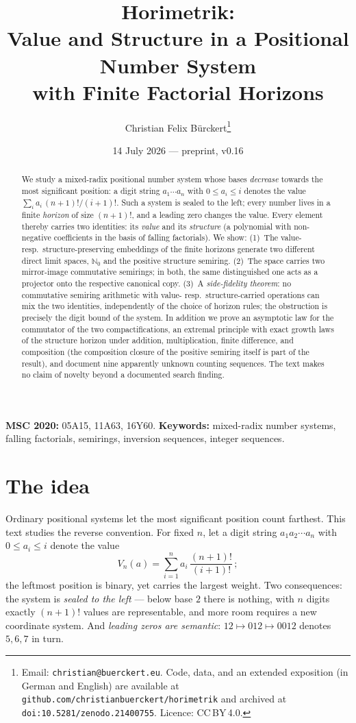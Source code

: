 \documentclass[11pt]{article}
\title{Horimetrik:\\
Value and Structure in a Positional Number System\\
with Finite Factorial Horizons}
\author{Christian Felix Bürckert\thanks{Email:
\texttt{christian@buerckert.eu}. Code, data, and an extended
exposition (in German and English) are available at
\texttt{github.com/christianbuerckert/horimetrik} and archived
at \texttt{doi:10.5281/zenodo.21400755}. Licence: CC\,BY\,4.0.}}
\date{14 July 2026 --- preprint, v0.16}
\theoremstyle{definition}
\theoremstyle{remark}
\newcommand{\NN}{\mathbb N_0}
\begin{document}
\maketitle

\begin{abstract}
We study a mixed-radix positional number system whose bases
\emph{decrease} towards the most significant position: a digit
string $a_1\cdots a_n$ with $0\le a_i\le i$ denotes the value
$\sum_i a_i\,(n+1)!/(i+1)!$. Such a system is sealed to the left;
every number lives in a finite \emph{horizon} of size $(n+1)!$, and
a leading zero changes the value. Every element thereby carries two
identities: its \emph{value} and its \emph{structure} (a polynomial
with non-negative coefficients in the basis of falling factorials).
We show: (1)~The value- resp.\ structure-preserving embeddings of
the finite horizons generate two different direct limit spaces,
$\NN$ and the positive structure semiring. (2)~The space carries two
mirror-image commutative semirings; in both, the same distinguished
one acts as a projector onto the respective canonical copy. (3)~A
\emph{side-fidelity theorem}: no commutative semiring arithmetic
with value- resp.\ structure-carried operations can mix the two
identities, independently of the choice of horizon rules; the
obstruction is precisely the digit bound of the system. In addition
we prove an asymptotic law for the commutator of the two
compactifications, an extremal principle with exact growth laws of
the structure horizon under addition, multiplication, finite
difference, and composition (the composition closure of the
positive semiring itself is part of the result), and document nine
apparently unknown counting sequences. The text makes no claim of
novelty beyond a documented search finding.
\end{abstract}

\noindent\textbf{MSC 2020:} 05A15, 11A63, 16Y60.\quad
\textbf{Keywords:} mixed-radix number systems, falling factorials,
semirings, inversion sequences, integer sequences.

\section{The idea}

Ordinary positional systems let the most significant position count
farthest. This text studies the reverse convention. For fixed $n$,
let a digit string $a_1a_2\cdots a_n$ with $0\le a_i\le i$ denote
the value
\[
V_n(a)=\sum_{i=1}^n a_i\,\frac{(n+1)!}{(i+1)!}\,;
\]
the leftmost position is binary, yet carries the largest weight.
Two consequences: the system is \emph{sealed to the left} --- below
base $2$ there is nothing, with $n$ digits exactly $(n+1)!$ values
are representable, and more room requires a new coordinate system.
And \emph{leading zeros are semantic}: $12\mapsto012\mapsto0012$
denotes $5,6,7$ in turn.
\end{document}
